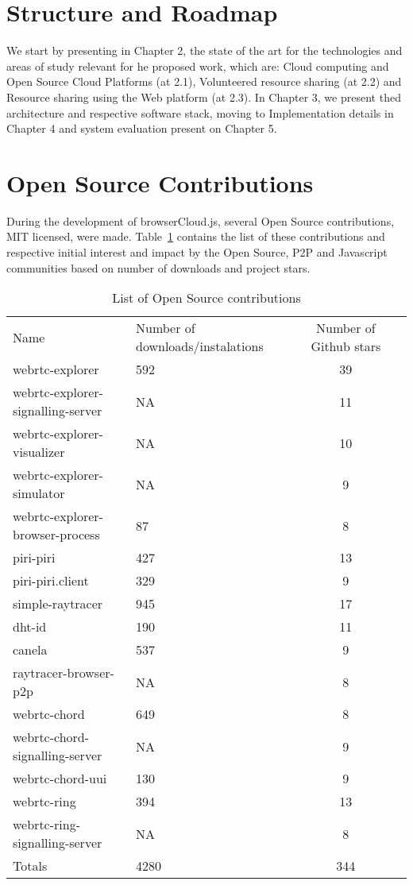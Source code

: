 \section{Structure and Roadmap}

We start by presenting in Chapter 2, the state of the art for the technologies and areas of study relevant for he proposed work, which are: Cloud computing and Open Source Cloud Platforms (at 2.1), Volunteered resource sharing (at 2.2) and Resource sharing using the Web platform (at 2.3). In Chapter 3, we present thed architecture and respective software stack, moving to Implementation details in Chapter 4 and system evaluation present on Chapter 5.

\section{Open Source Contributions}

During the development of browserCloud.js, several Open Source contributions, MIT licensed, were made. Table~\ref{tbl:codecontributions} contains the list of these contributions and respective initial interest and impact by the Open Source, P2P and Javascript communities based on number of downloads and project stars.

\begin{table}
  \centering
  \begin{tabular}{| l | l | c | c |}
  \hline
  Name &  Number of downloads/instalations & Number of Github stars  \\
  webrtc-explorer & 592 & 39 \\
  webrtc-explorer-signalling-server & NA & 11 \\
  webrtc-explorer-visualizer & NA & 10 \\
  webrtc-explorer-simulator & NA & 9 \\
  webrtc-explorer-browser-process & 87 & 8 \\
  piri-piri & 427 & 13 \\ 
  piri-piri.client & 329 & 9 \\
  simple-raytracer & 945 & 17 \\
  dht-id & 190 & 11 \\
  canela & 537 & 9 \\
  raytracer-browser-p2p & NA & 8 \\
  webrtc-chord & 649 & 8 \\
  webrtc-chord-signalling-server & NA & 9 \\
  webrtc-chord-uui & 130 & 9 \\
  webrtc-ring & 394 & 13 \\
  webrtc-ring-signalling-server & NA & 8 \\
  Totals & 4280 & 344 \\ 
  \hline
  \end{tabular}
  \caption{List of Open Source contributions}
  \label{tbl:codecontributions}
\end{table}

